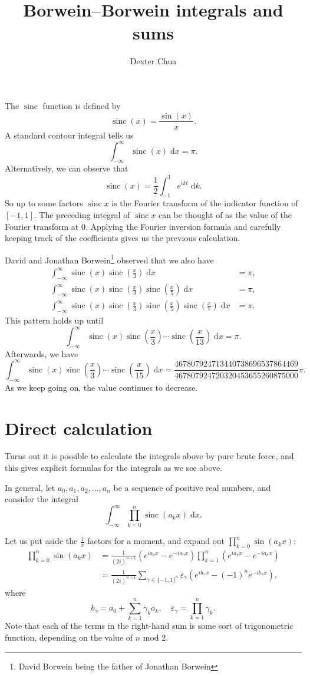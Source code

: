 \documentclass{shortart}
\title{Borwein--Borwein integrals and sums}
\author{Dexter Chua}
\theoremstyle{definition}
\DeclareMathOperator\sinc{sinc}
\renewcommand\d{\mathrm{d}}
\begin{document}
The $\sinc$ function is defined by
\[
  \sinc (x) = \frac{\sin (x)}{x}.
\]
A standard contour integral tells us
\[
  \int_{-\infty}^\infty \sinc (x) \;\d x = \pi.
\]
Alternatively, we can observe that
\[
  \sinc (x) = \frac{1}{2} \int_{-1}^1 e^{i k t}\;\d k.
\]
So up to some factors $\sinc x$ is the Fourier transform of the indicator function of $[-1, 1]$. The preceding integral of $\sinc x$ can be thought of as the value of the Fourier transform at $0$. Applying the Fourier inversion formula and carefully keeping track of the coefficients gives us the previous calculation.

David and Jonathan Borwein\footnote{David Borwein being the father of Jonathan Borwein} observed that we also have
\[
  \begin{aligned}
    \int_{-\infty}^\infty \sinc (x) \sinc \left(\frac{x}{3}\right) \;\d x &= \pi,\\
    \int_{-\infty}^\infty \sinc (x) \sinc \left(\frac{x}{3}\right)\sinc \left(\frac{x}{5}\right) \;\d x &= \pi,\\
    \int_{-\infty}^\infty \sinc (x) \sinc \left(\frac{x}{3}\right) \sinc \left(\frac{x}{5}\right) \sinc \left(\frac{x}{7}\right) \;\d x &= \pi.
  \end{aligned}
\]
This pattern holds up until
\[
  \int_{-\infty}^\infty \sinc (x) \sinc \left(\frac{x}{3}\right) \cdots \sinc \left(\frac{x}{13}\right) \;\d x = \pi.
\]
Afterwards, we have
\[
  \int_{-\infty}^\infty \sinc (x) \sinc \left(\frac{x}{3}\right) \cdots \sinc \left(\frac{x}{15}\right) \;\d x = \frac{467807924713440738696537864469}{467807924720320453655260875000} \pi.
\]
As we keep going on, the value continues to decrease.

\section{Direct calculation}
Turns out it is possible to calculate the integrals above by pure brute force, and this gives explicit formulas for the integrals as we see above.

In general, let $a_0, a_1, a_2, \ldots, a_n$ be a sequence of positive real numbers, and consider the integral
\[
  \int_{-\infty}^\infty \prod_{k = 0}^n \sinc (a_k x) \;\d x.
\]

Let us put aside the $\frac{1}{x}$ factors for a moment, and expand out $\prod_{k = 0}^n \sin (a_k x)$:
\[
  \begin{aligned}
    \prod_{k = 0}^n \sin(a_k x) &=  \frac{1}{(2i)^{n + 1}} (e^{i a_0 x} - e^{-i a_0 x}) \prod_{k = 1}^n (e^{i a_k x} - e^{-i a_k x})\\
    &= \frac{1}{(2i)^{n + 1}} \sum_{\gamma \in \{-1, 1\}^n} \varepsilon_\gamma (e^{i b_\gamma x} - (-1)^n e^{-i b_\gamma x}),
  \end{aligned}
\]
where
\[
  b_\gamma = a_0 + \sum_{k = 1}^n \gamma_k a_k,\quad \varepsilon_\gamma = \prod_{k = 1}^n \gamma_k.
\]
Note that each of the terms in the right-hand sum is some sort of trigonometric function, depending on the value of $n$ mod $2$.
\end{document}
